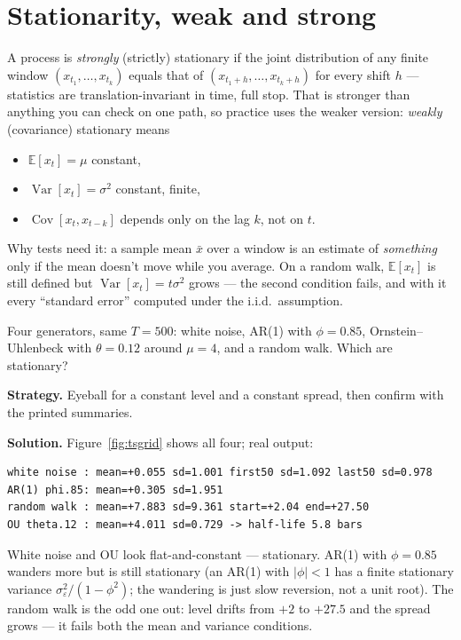 \section{Stationarity, weak and strong}\label{sec:stat}
A process is \emph{strongly} (strictly) stationary if the joint
distribution of any finite window $(x_{t_1},\dots,x_{t_k})$ equals
that of $(x_{t_1+h},\dots,x_{t_k+h})$ for every shift $h$ ---
statistics are translation-invariant in time, full stop. That is
stronger than anything you can check on one path, so practice uses
the weaker version: \emph{weakly} (covariance) stationary means
\begin{itemize}
\item $\mathbb E[x_t]=\mu$ constant,
\item $\operatorname{Var}[x_t]=\sigma^2$ constant, finite,
\item $\operatorname{Cov}[x_t,x_{t-k}]$ depends only on the lag $k$,
not on $t$.
\end{itemize}
Why tests need it: a sample mean $\bar x$ over a window is an
estimate of \emph{something} only if the mean doesn't move while you
average. On a random walk, $\mathbb E[x_t]$ is still defined but
$\operatorname{Var}[x_t]=t\sigma^2$ grows --- the second condition
fails, and with it every ``standard error'' computed under the
i.i.d.\ assumption.

\begin{example}\label{ex:tsgrid}
Four generators, same $T=500$:
white noise, AR(1) with $\phi=0.85$, Ornstein--Uhlenbeck with
$\theta=0.12$ around $\mu=4$, and a random walk. Which are
stationary?

\textbf{Strategy.} Eyeball for a constant level and a constant
spread, then confirm with the printed summaries.

\textbf{Solution.} Figure~\ref{fig:tsgrid} shows all four; real
output:
\begin{lstlisting}[numbers=none]
white noise : mean=+0.055 sd=1.001 first50 sd=1.092 last50 sd=0.978
AR(1) phi.85: mean=+0.305 sd=1.951
random walk : mean=+7.883 sd=9.361 start=+2.04 end=+27.50
OU theta.12 : mean=+4.011 sd=0.729 -> half-life 5.8 bars
\end{lstlisting}
White noise and OU look flat-and-constant --- stationary. AR(1) with
$\phi=0.85$ wanders more but is still stationary (an AR(1) with
$|\phi|<1$ has a finite stationary variance
$\sigma_\varepsilon^2/(1-\phi^2)$; the wandering is just slow
reversion, not a unit root). The random walk is the odd one out:
level drifts from $+2$ to $+27.5$ and the spread grows --- it fails
both the mean and variance conditions.
\end{example}


